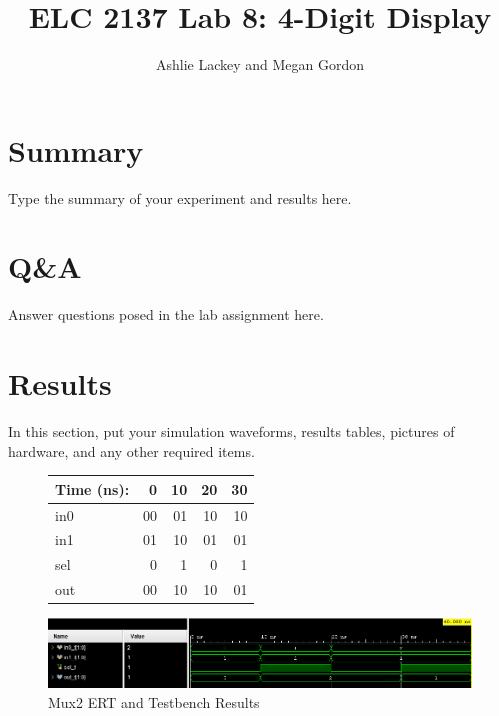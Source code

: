 \documentclass[11pt]{article}
\begin{document}
\title{ELC 2137 Lab 8: 4-Digit Display}
\author{Ashlie Lackey and Megan Gordon}

\maketitle


\section*{Summary}

Type the summary of your experiment and results here.  


\section*{Q\&A}

Answer questions posed in the lab assignment here.


\section*{Results}

In this section, put your simulation waveforms, results tables, pictures of hardware, and any other required items.

\begin{figure}[ht]\centering
	\begin{tabular}{l|rrrr}
		Time (ns): & 0 & 10 & 20 & 30 \\
		\midrule
		in0 & 00 & 01 & 10 & 10 \\
		in1 & 01 & 10 & 01 & 01 \\
		sel & 0 & 1 & 0 & 1 \\
		\midrule
		out & 00 & 10 & 10 & 01 \\
		\bottomrule
	\end{tabular}\medskip

	\includegraphics[width=1.1\textwidth]{mux2sim.png}
	\caption{Mux2 ERT and Testbench Results}
	\label{fig:sim_with_table}
\end{figure}
\clearpage
\end{document}
